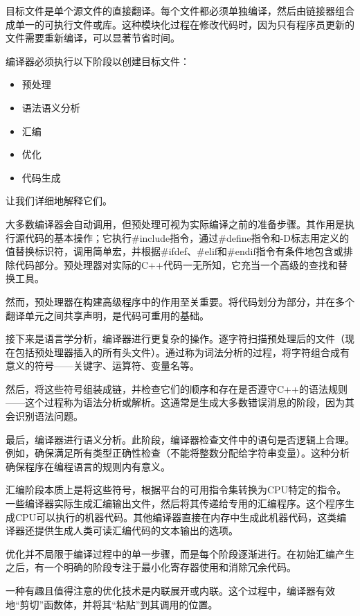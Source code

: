 目标文件是单个源文件的直接翻译。每个文件都必须单独编译，然后由链接器组合成单一的可执行文件或库。这种模块化过程在修改代码时，因为只有程序员更新的文件需要重新编译，可以显著节省时间。

编译器必须执行以下阶段以创建目标文件：

\begin{itemize}
\item
预处理

\item
语法语义分析

\item
汇编

\item
优化

\item
代码生成
\end{itemize}

让我们详细地解释它们。

大多数编译器会自动调用，但预处理可视为实际编译之前的准备步骤。其作用是执行源代码的基本操作；它执行\#include指令，通过\#define指令和-D标志用定义的值替换标识符，调用简单宏，并根据\#ifdef、\#elif和\#endif指令有条件地包含或排除代码部分。预处理器对实际的C++代码一无所知，它充当一个高级的查找和替换工具。

然而，预处理器在构建高级程序中的作用至关重要。将代码划分为部分，并在多个翻译单元之间共享声明，是代码可重用的基础。

接下来是语言学分析，编译器进行更复杂的操作。逐字符扫描预处理后的文件（现在包括预处理器插入的所有头文件）。通过称为词法分析的过程，将字符组合成有意义的符号——关键字、运算符、变量名等。

然后，将这些符号组装成链，并检查它们的顺序和存在是否遵守C++的语法规则——这个过程称为语法分析或解析。这通常是生成大多数错误消息的阶段，因为其会识别语法问题。

最后，编译器进行语义分析。此阶段，编译器检查文件中的语句是否逻辑上合理。例如，确保满足所有类型正确性检查（不能将整数分配给字符串变量）。这种分析确保程序在编程语言的规则内有意义。

汇编阶段本质上是将这些符号，根据平台的可用指令集转换为CPU特定的指令。一些编译器实际生成汇编输出文件，然后将其传递给专用的汇编程序。这个程序生成CPU可以执行的机器代码。其他编译器直接在内存中生成此机器代码，这类编译器还提供生成人类可读汇编代码的文本输出的选项。

优化并不局限于编译过程中的单一步骤，而是每个阶段逐渐进行。在初始汇编产生之后，有一个明确的阶段专注于最小化寄存器使用和消除冗余代码。

一种有趣且值得注意的优化技术是内联展开或内联。这个过程中，编译器有效地“剪切”函数体，并将其“粘贴”到其调用的位置。

